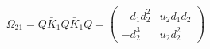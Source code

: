 \begin{equation}
\Omega_{21}=Q \bar{K}_1 Q \bar{K}_1 Q = \left(  \begin{array}{cc}
-d_1 d_2^2 & u_2 d_1 d_2  \\
-d_2^3  & u_2 d_2^2
\end{array}  \right)
\end{equation}

